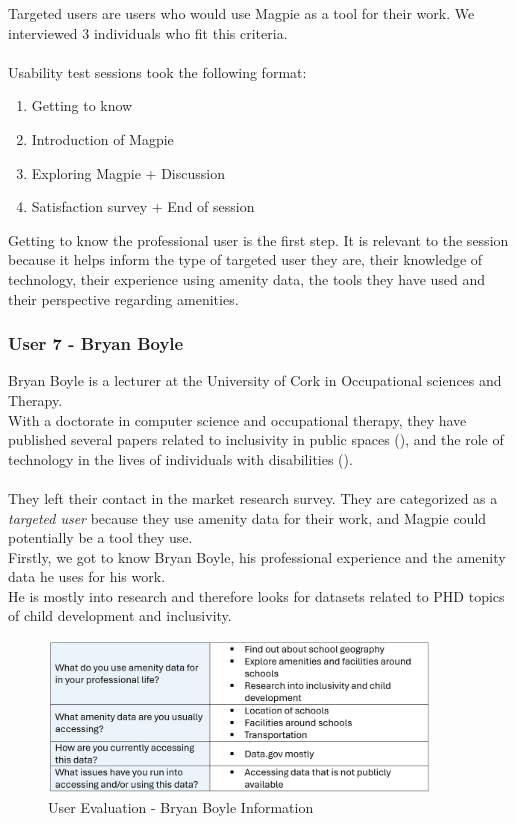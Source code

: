 Targeted users are users who would use Magpie as a tool for their work. We interviewed 3 individuals who fit this criteria.\\ \\
Usability test sessions took the following format:
\begin{enumerate}
    \item Getting to know
    \item Introduction of Magpie
    \item Exploring Magpie + Discussion
    \item Satisfaction survey + End of session
\end{enumerate}
Getting to know the professional user is the first step. It is relevant to the session because it helps inform the type of targeted user they are, their knowledge of technology, their experience using amenity data, the tools they have used and their perspective regarding amenities.

\subsubsection{User 7 - Bryan Boyle}
Bryan Boyle is a lecturer at the University of Cork in Occupational sciences and Therapy.\\ With a doctorate in computer science and occupational therapy, they have published several papers related to inclusivity in public spaces (\cite{bryanboyleplaygroundinclusion2023}), and the role of technology in the lives of individuals with disabilities (\cite{bryanboylechildrenautism2022}).\\ \\
They left their contact in the market research survey. They are categorized as a \emph{targeted user} because they use amenity data for their work, and Magpie could potentially be a tool they use.\\

\noindent Firstly, we got to know Bryan Boyle, his professional experience and the amenity data he uses for his work.\\
He is mostly into research and therefore looks for datasets related to PHD topics of child development and inclusivity.
\begin{figure}[h!]
    \centering
    \includegraphics[width=0.9\textwidth]{images/bryan-amenity-info.png}
    \caption{User Evaluation - Bryan Boyle Information}
\end{figure}\\

